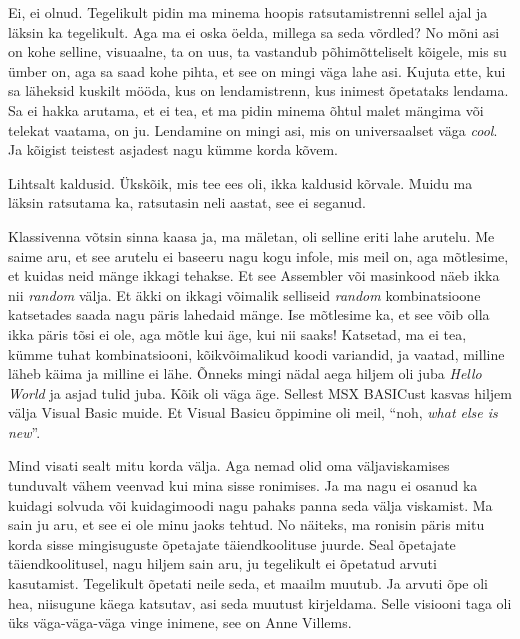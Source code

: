 
Ei, ei olnud. Tegelikult pidin ma minema hoopis ratsutamistrenni sellel ajal ja 
läksin ka tegelikult. Aga ma ei oska öelda, millega sa seda võrdled? No mõni 
asi on kohe selline,  visuaalne, ta on uus, ta vastandub  
põhimõtteliselt kõigele, mis su ümber on, aga sa saad kohe pihta, et see on 
mingi väga lahe asi. Kujuta ette, kui sa läheksid kuskilt mööda, kus on 
lendamistrenn, kus inimest õpetataks lendama. Sa ei  hakka arutama, et ei tea, 
et ma pidin  minema õhtul  malet mängima või telekat vaatama, on ju.  
Lendamine on  mingi asi, mis on universaalset väga \emph{cool}. Ja kõigist 
teistest asjadest nagu kümme korda kõvem.


Lihtsalt kaldusid. Ükskõik, mis tee ees oli, ikka kaldusid kõrvale. 
Muidu ma läksin ratsutama ka, ratsutasin neli aastat, see ei seganud.

Klassivenna võtsin sinna kaasa ja, ma mäletan, oli selline eriti lahe  
arutelu. Me saime aru, et see arutelu ei baseeru nagu kogu infole, mis meil on, 
aga mõtlesime, et kuidas neid mänge ikkagi tehakse. Et see Assembler või 
masinkood näeb ikka nii \emph{random} välja. Et äkki on ikkagi 
võimalik selliseid \emph{random} kombinatsioone katsetades saada nagu päris 
lahedaid mänge. Ise mõtlesime ka, et see võib olla ikka päris tõsi ei ole, 
aga mõtle kui äge, kui nii saaks! Katsetad,  ma ei tea, kümme tuhat 
kombinatsiooni, kõikvõimalikud koodi variandid, ja vaatad,  milline läheb käima 
ja milline ei lähe. Õnneks mingi nädal aega hiljem oli juba  \emph{Hello 
World} ja asjad tulid juba. Kõik oli  väga äge. Sellest MSX 
BASICust  kasvas hiljem välja Visual 
Basic muide. Et Visual Basicu õppimine oli meil, 
\enquote{noh, \emph{what else is new}}.


Mind visati sealt mitu korda välja. Aga nemad olid oma väljaviskamises 
tunduvalt vähem veenvad kui mina sisse ronimises. Ja ma nagu ei osanud ka  
kuidagi solvuda või kuidagimoodi nagu pahaks panna seda välja viskamist.  
Ma sain ju aru, et see ei ole minu jaoks tehtud. No näiteks, ma ronisin päris 
mitu korda sisse mingisuguste õpetajate täiendkoolituse juurde. Seal õpetajate 
täiendkoolitusel, nagu hiljem sain aru, ju tegelikult ei õpetatud 
arvuti kasutamist. Tegelikult õpetati neile seda, et maailm muutub. Ja arvuti õpe oli 
hea, niisugune käega katsutav, asi seda muutust kirjeldama. Selle visiooni taga oli üks 
väga-väga-väga vinge inimene, see on Anne Villems.

